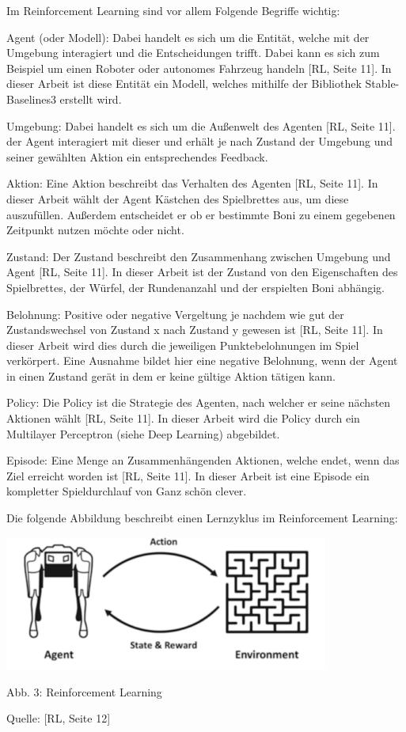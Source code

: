 Im Reinforcement Learning sind vor allem Folgende Begriffe wichtig:

Agent (oder Modell): Dabei handelt es sich um die Entität, welche mit der Umgebung interagiert und die Entscheidungen trifft. Dabei kann es sich zum Beispiel um einen Roboter oder autonomes Fahrzeug handeln [RL, Seite 11]. In dieser Arbeit ist diese Entität ein Modell, welches mithilfe der Bibliothek Stable-Baselines3 erstellt wird.

Umgebung: Dabei handelt es sich um die Außenwelt des Agenten [RL, Seite 11]. der Agent interagiert mit dieser und erhält je nach Zustand der Umgebung und seiner gewählten Aktion ein entsprechendes Feedback.

Aktion: Eine Aktion beschreibt das Verhalten des Agenten [RL, Seite 11]. In dieser Arbeit wählt der Agent Kästchen des Spielbrettes aus, um diese auszufüllen. Außerdem entscheidet er ob er bestimmte Boni zu einem gegebenen Zeitpunkt nutzen möchte oder nicht.

Zustand: Der Zustand beschreibt den Zusammenhang zwischen Umgebung und Agent [RL, Seite 11]. In dieser Arbeit ist der Zustand von den Eigenschaften des Spielbrettes, der Würfel, der Rundenanzahl und der erspielten Boni abhängig.

Belohnung: Positive oder negative Vergeltung je nachdem wie gut der Zustandswechsel von Zustand x nach Zustand y gewesen ist [RL, Seite 11]. In dieser Arbeit wird dies durch die jeweiligen Punktebelohnungen im Spiel verkörpert. Eine Ausnahme bildet hier eine negative Belohnung, wenn der Agent in einen Zustand gerät in dem er keine gültige Aktion tätigen kann.

Policy: Die Policy ist die Strategie des Agenten, nach welcher er seine nächsten Aktionen wählt [RL, Seite 11]. In dieser Arbeit wird die Policy durch ein Multilayer Perceptron (siehe Deep Learning) abgebildet.

Episode: Eine Menge an Zusammenhängenden Aktionen, welche endet, wenn das Ziel erreicht worden ist [RL, Seite 11]. In dieser Arbeit ist eine Episode ein kompletter Spieldurchlauf von Ganz schön clever.\\

\begin{minipage}{\linewidth}
	Die folgende Abbildung beschreibt einen Lernzyklus im Reinforcement Learning:

	\vspace{0.5cm}
	\includegraphics[width=0.8\textwidth]{Bilder/rl}
	
	Abb. 3: Reinforcement Learning
	
	Quelle: [RL, Seite 12]\\
\end{minipage}

